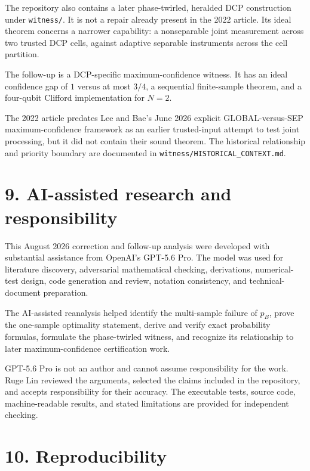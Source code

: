 \documentclass[
  10pt,
]{article}
\begin{document}
The repository also contains a later phase-twirled, heralded DCP
construction under \texttt{witness/}. It is not a repair already present
in the 2022 article. Its ideal theorem concerns a narrower capability: a
nonseparable joint measurement across two trusted DCP cells, against
adaptive separable instruments across the cell partition.

The follow-up is a DCP-specific maximum-confidence witness. It has an
ideal confidence gap of \(1\) versus at most \(3/4\), a sequential
finite-sample theorem, and a four-qubit Clifford implementation for
\(N=2\).

The 2022 article predates Lee and Bae's June 2026 explicit
GLOBAL-versus-SEP maximum-confidence framework as an earlier
trusted-input attempt to test joint processing, but it did not contain
their sound theorem. The historical relationship and priority boundary
are documented in \texttt{witness/HISTORICAL\_CONTEXT.md}.

\section{9. AI-assisted research and
responsibility}\label{ai-assisted-research-and-responsibility}

This August 2026 correction and follow-up analysis were developed with
substantial assistance from OpenAI's GPT-5.6 Pro. The model was used for
literature discovery, adversarial mathematical checking, derivations,
numerical-test design, code generation and review, notation consistency,
and technical-document preparation.

The AI-assisted reanalysis helped identify the multi-sample failure of
\(p_B\), prove the one-sample optimality statement, derive and verify
exact probability formulas, formulate the phase-twirled witness, and
recognize its relationship to later maximum-confidence certification
work.

GPT-5.6 Pro is not an author and cannot assume responsibility for the
work. Ruge Lin reviewed the arguments, selected the claims included in
the repository, and accepts responsibility for their accuracy. The
executable tests, source code, machine-readable results, and stated
limitations are provided for independent checking.

\section{10. Reproducibility}\label{reproducibility}
\end{document}
